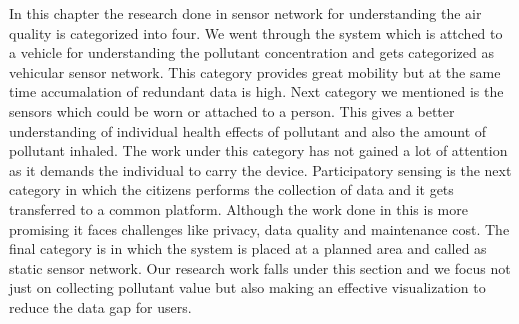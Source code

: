  In this chapter the research done in sensor network for understanding the air quality is categorized into four. We went through the system which is attched to a vehicle for understanding the pollutant concentration and gets categorized as vehicular sensor network. This category provides great mobility but at the same time accumalation of redundant data is high.
 Next category we mentioned is the sensors which could be worn or attached to a person. This gives a better understanding of individual health effects of pollutant and also the amount of pollutant inhaled. The work under this category has not gained a lot of attention as it demands the individual to carry the device. 
Participatory sensing is the next category in which the citizens performs the collection of data and it gets transferred to a common platform. Although the work done in this is more promising it faces challenges like privacy, data quality and maintenance cost. The final category is in which the system is placed at a planned area and called as static sensor network. Our research work falls under this section and we focus not just on collecting pollutant value but also making an effective visualization to reduce the data gap for users.